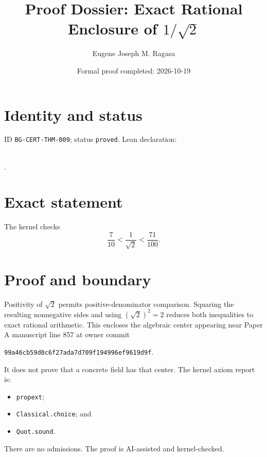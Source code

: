 \documentclass[11pt]{article}
\title{Proof Dossier: Exact Rational Enclosure of $1/\sqrt{2}$}\author{Eugene Joseph M. Ragasa}\date{Formal proof completed: 2026-10-19}
\begin{document}
\maketitle
\section{Identity and status}
ID \texttt{BG-CERT-THM-009}; status \texttt{proved}. Lean declaration:
\par{}\\
{\tiny{}}.
\section{Exact statement}
The kernel checks
\[
 \frac{7}{10}<\frac{1}{\sqrt{2}}<\frac{71}{100}.
\]
\section{Proof and boundary}
Positivity of $\sqrt2$ permits positive-denominator comparison. Squaring the resulting
nonnegative sides and using $(\sqrt2)^2=2$ reduces both inequalities to exact rational
arithmetic. This encloses the algebraic center appearing near Paper A manuscript line 857
at owner commit
\begin{center}\small\texttt{99a46cb59d0c6f27ada7d709f194996ef9619d9f}.\end{center}
It does not prove that a concrete field has that center. The kernel axiom report is:
\begin{itemize}
\item \texttt{propext};
\item \texttt{Classical.choice}; and
\item \texttt{Quot.sound}.
\end{itemize}
There are no admissions. The proof is AI-assisted and kernel-checked.
\end{document}
